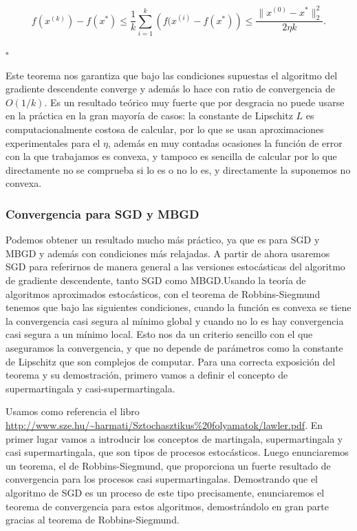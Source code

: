 $$f(x^{(k)}) - f(x^*) \leq \frac{1}{k} \sum ^k _{i=1} \left ( f(x^{(i)} - f(x^*) \right ) \leq \frac{\|x^{(0)}-x^* \|^2_2}{2\eta k} .$$


\begin{flushright}
    $\square$
\end{flushright} 


Este teorema nos garantiza que bajo las condiciones supuestas el algoritmo del gradiente descendente converge y además lo hace con ratio de convergencia de $O(1/k)$. Es un resultado teórico muy fuerte que por desgracia no puede usarse en la práctica en la gran mayoría de casos: la constante de Lipschitz $L$ es computacionalmente costosa de calcular, por lo que se usan aproximaciones experimentales para el $\eta$, además en muy contadas ocasiones la función de error con la que trabajamos es convexa, y tampoco es sencilla de calcular por lo que directamente no se comprueba si lo es o no lo es, y directamente la suponemos no convexa. 



\subsubsection{Convergencia para SGD y MBGD}


Podemos obtener un resultado mucho más práctico, ya que es para SGD y MBGD y además con condiciones más relajadas. A partir de ahora usaremos SGD para referirnos de manera general a las versiones estocásticas del algoritmo de gradiente descendente, tanto SGD como MBGD.Usando la teoría de algoritmos aproximados estocásticos, con el teorema de Robbins-Siegmund tenemos que bajo las siguientes condiciones, cuando la función es convexa se tiene la convergencia casi segura al mínimo global y cuando no lo es hay convergencia casi segura a un mínimo local. Esto nos da un criterio sencillo con el que aseguramos la convergencia, y que no depende de parámetros como la constante de Lipschitz que son complejos de computar. Para una correcta exposición del teorema y su demostración, primero vamos a definir el concepto de supermartingala y casi-supermartingala. 

Usamos como referencia el libro \url{http://www.sze.hu/~harmati/Sztochasztikus\%20folyamatok/lawler.pdf}. En primer lugar vamos a introducir los conceptos de martingala, supermartingala y casi supermartingala, que son tipos de procesos estocásticos. Luego enunciaremos un teorema, el de Robbins-Siegmund, que proporciona un fuerte resultado de convergencia para los procesos casi supermartingalas. Demostrando que el algoritmo de SGD es un proceso de este tipo precisamente, enunciaremos el teorema de convergencia para estos algoritmos, demostrándolo en gran parte gracias al teorema de Robbins-Siegmund.





